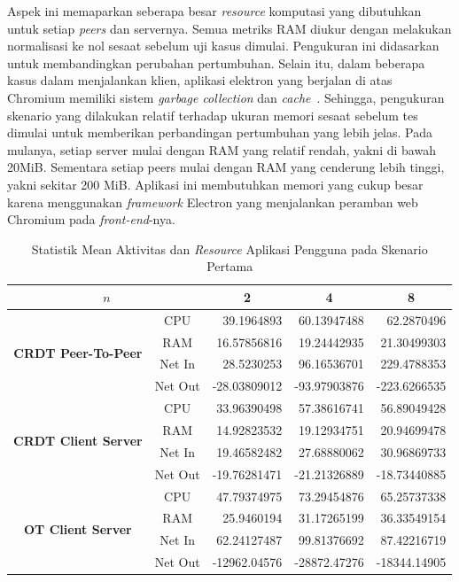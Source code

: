 Aspek ini memaparkan seberapa besar \textit{resource} komputasi yang dibutuhkan untuk setiap \textit{peers} dan servernya. Semua metriks RAM diukur dengan melakukan normalisasi ke nol sesaat sebelum uji kasus dimulai. Pengukuran ini didasarkan untuk membandingkan perubahan pertumbuhan. Selain itu, dalam beberapa kasus dalam menjalankan klien, aplikasi elektron yang berjalan di atas Chromium memiliki sistem \textit{garbage collection} dan \textit{cache}~\citep{chromium}. Sehingga, pengukuran skenario yang dilakukan relatif terhadap ukuran memori sesaat sebelum tes dimulai untuk memberikan perbandingan pertumbuhan yang lebih jelas. Pada mulanya, setiap server mulai dengan RAM yang relatif rendah, yakni di bawah 20MiB. Sementara setiap peers mulai dengan RAM yang cenderung lebih tinggi, yakni sekitar 200 MiB. Aplikasi ini membutuhkan memori yang cukup besar karena menggunakan \textit{framework} Electron yang menjalankan peramban web Chromium pada \textit{front-end}-nya.

\begin{table}[H]
 \centering

\begin{tabular}{|cc|r|r|r|}
\hline
\multicolumn{2}{|c|}{$n$} & \multicolumn{1}{c|}{\textbf{2}} & \multicolumn{1}{c|}{\textbf{4}} & \multicolumn{1}{c|}{\textbf{8}} \\ \hline
\multicolumn{1}{|c|}{\multirow{4}{*}{\textbf{CRDT Peer-To-Peer}}} & CPU & 39.1964893 & 60.13947488 & 62.2870496 \\ \cline{2-5}
\multicolumn{1}{|c|}{} & RAM & 16.57856816 & 19.24442935 & 21.30499303 \\ \cline{2-5}
\multicolumn{1}{|c|}{} & Net In & 28.5230253 & 96.16536701 & 229.4788353 \\ \cline{2-5}
\multicolumn{1}{|c|}{} & Net Out & -28.03809012 & -93.97903876 & -223.6266535 \\ \hline
\multicolumn{1}{|c|}{\multirow{4}{*}{\textbf{CRDT Client Server}}} & CPU & 33.96390498 & 57.38616741 & 56.89049428 \\ \cline{2-5}
\multicolumn{1}{|c|}{} & RAM & 14.92823532 & 19.12934751 & 20.94699478 \\ \cline{2-5}
\multicolumn{1}{|c|}{} & Net In & 19.46582482 & 27.68880062 & 30.96869733 \\ \cline{2-5}
\multicolumn{1}{|c|}{} & Net Out & -19.76281471 & -21.21326889 & -18.73440885 \\ \hline
\multicolumn{1}{|c|}{\multirow{4}{*}{\textbf{OT Client Server}}} & CPU & 47.79374975 & 73.29454876 & 65.25737338 \\ \cline{2-5}
\multicolumn{1}{|c|}{} & RAM & 25.9460194 & 31.17265199 & 36.33549154 \\ \cline{2-5}
\multicolumn{1}{|c|}{} & Net In & 62.24127487 & 99.81376692 & 87.42216719 \\ \cline{2-5}
\multicolumn{1}{|c|}{} & Net Out & -12962.04576 & -28872.47276 & -18344.14905 \\ \hline
\end{tabular}
 \label{tab:resource-client-1}
 \caption{Statistik Mean Aktivitas dan \textit{Resource} Aplikasi Pengguna pada Skenario Pertama}
\end{table}

